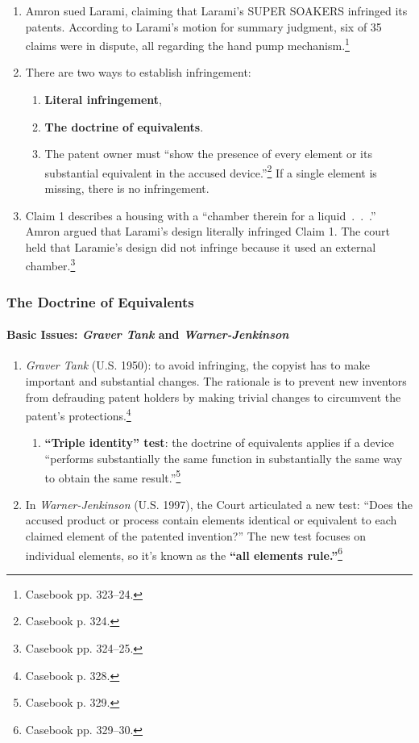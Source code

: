 \begin{enumerate}
    \item Amron sued Larami, claiming that Larami's SUPER SOAKERS infringed its 
    patents. According to Larami's motion for summary judgment, six of 35 claims 
    were in dispute, all regarding the hand pump mechanism.\footnote{Casebook 
    pp. 323--24.}
    \item There are two ways to establish infringement:
    \begin{enumerate}
        \item \textbf{Literal infringement},
        \item \textbf{The doctrine of equivalents}.
        \item The patent owner must ``show the presence of every element or its 
        substantial equivalent in the accused device.''\footnote{Casebook p. 
        324.} If a single element is missing, there is no infringement.
    \end{enumerate}
    \item Claim 1 describes a housing with a ``chamber therein for a 
    liquid~.~.~.'' Amron argued that Larami's design literally infringed Claim 
    1. The court held that Laramie's design did not infringe because it used an 
    external chamber.\footnote{Casebook pp. 324--25.}
\end{enumerate}

\subsubsection{The Doctrine of Equivalents}

\paragraph{Basic Issues: \emph{Graver Tank} and \emph{Warner-Jenkinson}}

\begin{enumerate}
    \item \emph{Graver Tank} (U.S. 1950): to avoid infringing, the copyist has 
    to make important and substantial changes. The rationale is to prevent new 
    inventors from defrauding patent holders by making trivial changes to 
    circumvent the patent's protections.\footnote{Casebook p. 328.}
    \begin{enumerate}
        \item \textbf{``Triple identity'' test}: the doctrine of equivalents 
        applies if a device ``performs substantially the same function in 
        substantially the same way to obtain the same 
        result.''\footnote{Casebook p. 329.}
    \end{enumerate}
    \item In \emph{Warner-Jenkinson} (U.S. 1997), the Court articulated a new 
    test: ``Does the accused product or process contain elements identical or 
    equivalent to each claimed element of the patented invention?'' The new test 
    focuses on individual elements, so it's known as the \textbf{``all elements 
    rule.''}\footnote{Casebook pp. 329--30.}
\end{enumerate}


